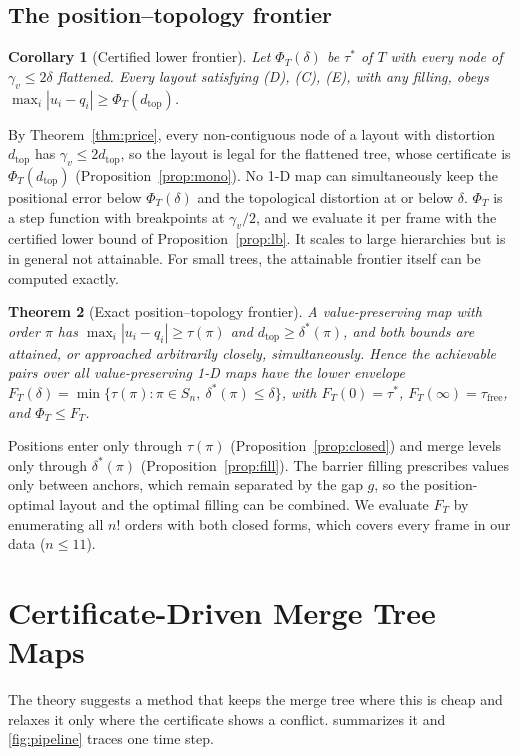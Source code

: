 \documentclass[review]{vgtc}                 %
\newtheorem{theorem}{Theorem}
\newtheorem{corollary}[theorem]{Corollary}
\newcommand{\free}{\mathrm{free}}
\newcommand{\dtop}{d_{\mathrm{top}}}
\begin{document}
\subsection{The position--topology frontier}
\begin{corollary}[Certified lower frontier]\label{cor:frontier}
Let $\Phi_T(\delta)$ be $\tau^*$ of $T$ with every node of $\gamma_v\le2\delta$ flattened. Every layout satisfying (D), (C), (E), with any filling, obeys $\max_i|u_i-q_i|\ge\Phi_T(\dtop)$.
\end{corollary}
By Theorem~\ref{thm:price}, every non-contiguous node of a layout with distortion $\dtop$ has $\gamma_v\le2\dtop$, so the layout is legal for the flattened tree, whose certificate is $\Phi_T(\dtop)$ (Proposition~\ref{prop:mono}). No 1-D map can simultaneously keep the positional error below $\Phi_T(\delta)$ and the topological distortion at or below $\delta$. $\Phi_T$ is a step function with breakpoints at $\gamma_v/2$, and we evaluate it per frame with the certified lower bound of Proposition~\ref{prop:lb}. It scales to large hierarchies but is in general not attainable. For small trees, the attainable frontier itself can be computed exactly.

\begin{theorem}[Exact position--topology frontier]\label{thm:exact}
A value-preserving map with order $\pi$ has $\max_i|u_i-q_i|\ge\tau(\pi)$ and $\dtop\ge\delta^*(\pi)$, and both bounds are attained, or approached arbitrarily closely, simultaneously. Hence the achievable pairs over all value-preserving 1-D maps have the lower envelope $F_T(\delta)=\min\{\tau(\pi):\pi\in S_n,\ \delta^*(\pi)\le\delta\}$, with $F_T(0)=\tau^*$, $F_T(\infty)=\tau_\free$, and $\Phi_T\le F_T$.
\end{theorem}
Positions enter only through $\tau(\pi)$ (Proposition~\ref{prop:closed}) and merge levels only through $\delta^*(\pi)$ (Proposition~\ref{prop:fill}). The barrier filling prescribes values only between anchors, which remain separated by the gap $g$, so the position-optimal layout and the optimal filling can be combined. We evaluate $F_T$ by enumerating all $n!$ orders with both closed forms, which covers every frame in our data ($n\le11$).

\section{Certificate-Driven Merge Tree Maps}\label{sec:method}

The theory suggests a method that keeps the merge tree where this is cheap and relaxes it only where the certificate shows a conflict.  summarizes it and \cref{fig:pipeline} traces one time step.
\end{document}
